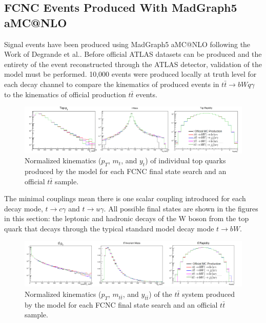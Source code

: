 \subsection{FCNC Events Produced With MadGraph5 aMC@NLO}

Signal events have been produced using MadGraph5 aMC@NLO following the Work of Degrande et al.\cite{Degrande:2014tta}.  Before official ATLAS datasets can be produced and the entirety of the event reconstructed through the ATLAS detector, validation of the model must be performed.  10,000 events were produced locally at truth level for each decay channel to compare the kinematics of produced events in $t\bar{t}\rightarrow bWq\gamma$ to the kinematics of official production $t\bar{t}$ events. 

\begin{figure}[h!]
	\centering
	\includegraphics[width=\columnwidth]{../ThesisImages/FCNCValidation/singleTops.png}
	\caption{ Normalized kinematics ($p_T$, $m_t$, and $y_t$) of individual top quarks produced by the model for each FCNC final state search and an official $t\bar{t}$ sample.
	}
\end{figure}


The minimal couplings mean there is one scalar coupling introduced for each decay mode, $t\rightarrow c\gamma$ and $t\rightarrow u\gamma$.  All possible final states are shown in the figures in this section: the leptonic and hadronic decays of the W boson from the top quark that decays through the typical standard model decay mode $t\rightarrow bW$. 

\begin{figure}[h!]
	\centering
	\includegraphics[width=\columnwidth]{../ThesisImages/FCNCValidation/ttBarSys.png}
	\caption{Normalized kinematics ($p_T$, $m_{t\bar{t}}$, and $y_{t\bar{t}}$) of the $t\bar{t}$ system produced by the model for each FCNC final state search and an official $t\bar{t}$ sample.
	}
\end{figure}

